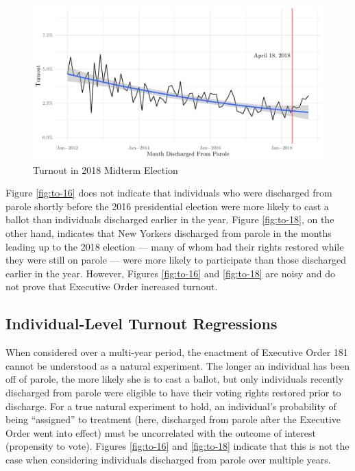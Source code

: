 \documentclass[]{article}
\begin{document}
\begin{figure}[H]

{\centering \includegraphics{felony_disenfranchisement_nys_files/figure-latex/to-18-chart-1} 

}

\caption{\label{fig:to-18}Turnout in 2018 Midterm Election}\label{fig:to-18-chart}
\end{figure}

Figure \ref{fig:to-16} does not indicate that individuals who were discharged from parole shortly before the 2016 presidential election were more likely to cast a ballot than individuals discharged earlier in the year. Figure \ref{fig:to-18}, on the other hand, indicates that New Yorkers discharged from parole in the months leading up to the 2018 election --- many of whom had their rights restored while they were still on parole --- were more likely to participate than those discharged earlier in the year. However, Figures \ref{fig:to-16} and \ref{fig:to-18} are noisy and do not prove that Executive Order increased turnout.

\hypertarget{individual-level-turnout-regressions}{%
\subsection*{Individual-Level Turnout Regressions}\label{individual-level-turnout-regressions}}

When considered over a multi-year period, the enactment of Executive Order 181 cannot be understood as a natural experiment. The longer an individual has been off of parole, the more likely she is to cast a ballot, but only individuals recently discharged from parole were eligible to have their voting rights restored prior to discharge. For a true natural experiment to hold, an individual's probability of being ``assigned'' to treatment (here, discharged from parole after the Executive Order went into effect) must be uncorrelated with the outcome of interest (propensity to vote). Figures \ref{fig:to-16} and \ref{fig:to-18} indicate that this is not the case when considering individuals discharged from parole over multiple years.
\end{document}
